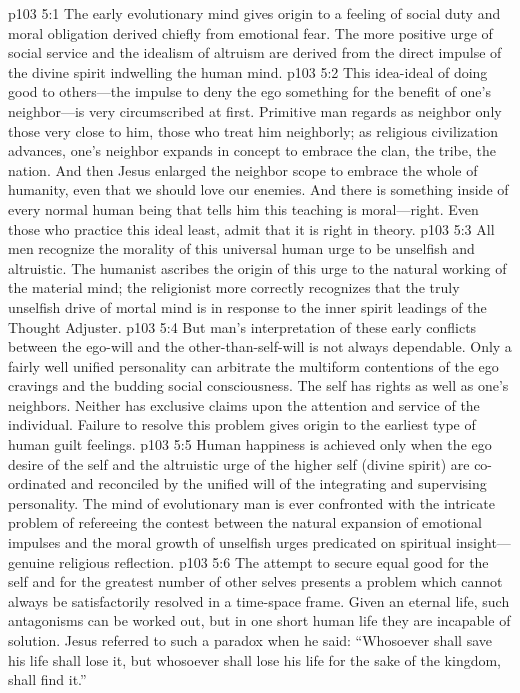 \vs p103 5:1 The early evolutionary mind gives origin to a feeling of social duty and moral obligation derived chiefly from emotional fear. The more positive urge of social service and the idealism of altruism are derived from the direct impulse of the divine spirit indwelling the human mind.
\vs p103 5:2 This idea\hyp{}ideal of doing good to others---the impulse to deny the ego something for the benefit of one’s neighbor---is very circumscribed at first. Primitive man regards as neighbor only those very close to him, those who treat him neighborly; as religious civilization advances, one’s neighbor expands in concept to embrace the clan, the tribe, the nation. And then Jesus enlarged the neighbor scope to embrace the whole of humanity, even that we should love our enemies. And there is something inside of every normal human being that tells him this teaching is moral---right. Even those who practice this ideal least, admit that it is right in theory.
\vs p103 5:3 All men recognize the morality of this universal human urge to be unselfish and altruistic. The humanist ascribes the origin of this urge to the natural working of the material mind; the religionist more correctly recognizes that the truly unselfish drive of mortal mind is in response to the inner spirit leadings of the Thought Adjuster.
\vs p103 5:4 But man’s interpretation of these early conflicts between the ego\hyp{}will and the other\hyp{}than\hyp{}self\hyp{}will is not always dependable. Only a fairly well unified personality can arbitrate the multiform contentions of the ego cravings and the budding social consciousness. The self has rights as well as one’s neighbors. Neither has exclusive claims upon the attention and service of the individual. Failure to resolve this problem gives origin to the earliest type of human guilt feelings.
\vs p103 5:5 Human happiness is achieved only when the ego desire of the self and the altruistic urge of the higher self (divine spirit) are co\hyp{}ordinated and reconciled by the unified will of the integrating and supervising personality. The mind of evolutionary man is ever confronted with the intricate problem of refereeing the contest between the natural expansion of emotional impulses and the moral growth of unselfish urges predicated on spiritual insight---genuine religious reflection.
\vs p103 5:6 The attempt to secure equal good for the self and for the greatest number of other selves presents a problem which cannot always be satisfactorily resolved in a time\hyp{}space frame. Given an eternal life, such antagonisms can be worked out, but in one short human life they are incapable of solution. Jesus referred to such a paradox when he said: “Whosoever shall save his life shall lose it, but whosoever shall lose his life for the sake of the kingdom, shall find it.”
